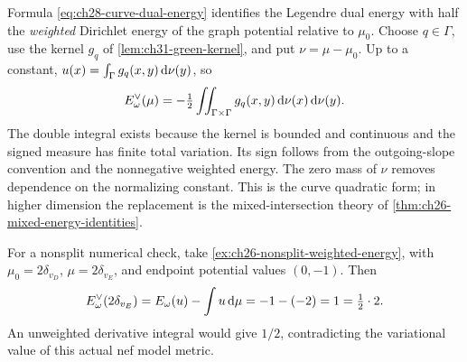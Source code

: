 \begin{remark}
\label{rem:ch28-classical-energy}
Formula \eqref{eq:ch28-curve-dual-energy} identifies the Legendre dual
energy with half the \emph{weighted} Dirichlet energy of the graph
potential relative to \(\mu_0\).  Choose \(q\in\Gamma\), use the
kernel \(g_q\) of \cref{lem:ch31-green-kernel}, and put
\(\nu=\mu-\mu_0\).  Up to a constant,
\(u(x)=\int_\Gamma g_q(x,y)\,\mathrm d\nu(y)\), so
\[
 E^\vee_\omega(\mu)
 =-\tfrac12\iint_{\Gamma\times\Gamma}
          g_q(x,y)\,\mathrm d\nu(x)\,\mathrm d\nu(y).
\]
The double integral exists because the kernel is bounded and continuous
and the signed measure has finite total variation.  Its sign follows
from the outgoing-slope convention and the nonnegative weighted energy.
The zero mass of \(\nu\) removes dependence on the normalizing constant.
This is the curve quadratic form; in higher dimension the replacement is
the mixed-intersection theory of \cref{thm:ch26-mixed-energy-identities}.

For a nonsplit numerical check, take
\cref{ex:ch26-nonsplit-weighted-energy}, with
\(\mu_0=2\delta_{v_D}\), \(\mu=2\delta_{v_E}\), and endpoint
potential values \((0,-1)\).  Then
\[
 E^\vee_\omega(2\delta_{v_E})
 =E_\omega(u)-\int u\,\mathrm d\mu=-1-(-2)=1
 =\tfrac12\cdot2.
\]
An unweighted derivative integral would give \(1/2\), contradicting
the variational value of this actual nef model metric.
\end{remark}
